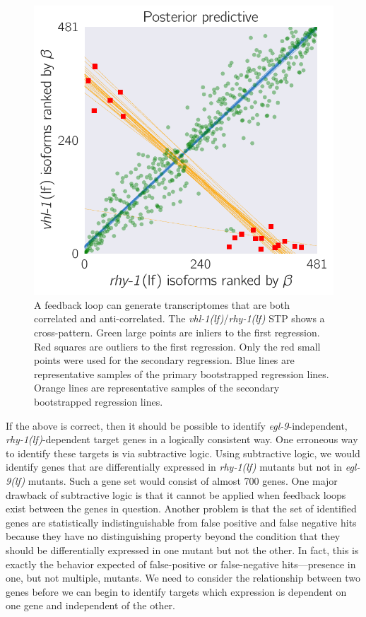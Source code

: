 \documentclass[10pt, onecolumn]{article}
\newcommand{\gene}[1]{\emph{#1}}
\newcommand{\egl}{\emph{\mbox{egl-9}(lf)}}
\newcommand{\rhy}{\emph{\mbox{rhy-1}(lf)}}
\newcommand{\vhl}{\emph{\mbox{vhl-1}(lf)}}
\begin{document}
\begin{figure}[tbhp]
\centering
\includegraphics[width=.4\linewidth]{../figs/multiplemodes-ed.pdf}
\caption{
A feedback loop can generate transcriptomes that are both
correlated and anti-correlated. The \vhl{}/\rhy{} STP shows a cross-pattern.
Green large points are inliers to the first
regression. Red squares are outliers to the first regression. Only the red
small points were used for the secondary regression. Blue lines are representative
samples of the primary bootstrapped regression lines. Orange lines are
representative samples of the secondary bootstrapped regression lines.
}
\label{fig:xpattern}
\end{figure}



If the above is correct, then it should be possible to identify
\gene{egl-9}-independent, \rhy{}-dependent target genes in a
logically consistent way.
One erroneous way to identify these targets is via
subtractive logic. Using subtractive logic, we would identify genes that are
differentially expressed in \rhy{} mutants but not in \egl{} mutants.  Such a
gene set would
consist of almost 700 genes. One major drawback of subtractive logic is that it
cannot be applied when feedback loops exist between the genes in question.
Another problem is that the set of identified genes are statistically indistinguishable
from false positive and false negative hits because they have no distinguishing
property beyond the condition that they should be differentially expressed in
one mutant but not the other. In fact, this is exactly the behavior expected of
false-positive or false-negative hits---presence in one, but not multiple, mutants.
We need to consider the relationship between two genes before we can begin to
identify targets which expression is dependent on one gene and independent
of the other.
\end{document}
